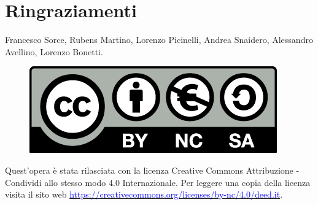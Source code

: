 \documentclass[11pt,headheight=35pt]{scrartcl}
\begin{document}
\section*{Ringraziamenti}
Francesco Sorce, Rubens Martino, Lorenzo Picinelli, Andrea Snaidero, Alessandro Avellino, Lorenzo Bonetti.

\vfill
\begin{figure}
	\href{https://creativecommons.org/licenses/by-nc/4.0/deed.it}{\includegraphics[scale=0.20]{immagini/licenza.png}}
\end{figure}
Quest'opera è stata rilasciata con la licenza Creative Commons Attribuzione - Condividi allo stesso modo 4.0 Internazionale.
Per leggere una copia della licenza visita il sito web \href{http://creativecommons.org/licenses/by-sa/4.0/deed.it}{\textcolor{blue}{https://creativecommons.org/licenses/by-nc/4.0/deed.it}}.

\newpage
















\appendix

\end{document}
